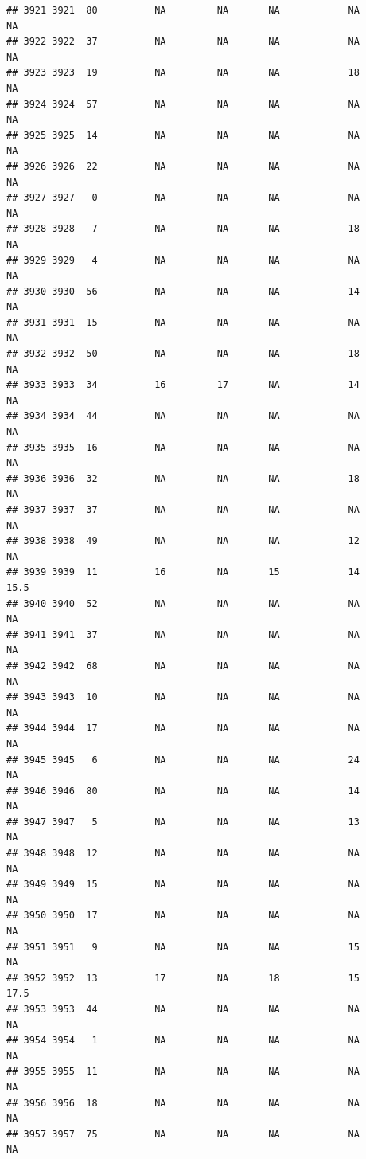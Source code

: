 \documentclass[man]{apa6}
\begin{document}
\begin{verbatim}
## 3921 3921  80          NA         NA       NA            NA       NA
## 3922 3922  37          NA         NA       NA            NA       NA
## 3923 3923  19          NA         NA       NA            18       NA
## 3924 3924  57          NA         NA       NA            NA       NA
## 3925 3925  14          NA         NA       NA            NA       NA
## 3926 3926  22          NA         NA       NA            NA       NA
## 3927 3927   0          NA         NA       NA            NA       NA
## 3928 3928   7          NA         NA       NA            18       NA
## 3929 3929   4          NA         NA       NA            NA       NA
## 3930 3930  56          NA         NA       NA            14       NA
## 3931 3931  15          NA         NA       NA            NA       NA
## 3932 3932  50          NA         NA       NA            18       NA
## 3933 3933  34          16         17       NA            14       NA
## 3934 3934  44          NA         NA       NA            NA       NA
## 3935 3935  16          NA         NA       NA            NA       NA
## 3936 3936  32          NA         NA       NA            18       NA
## 3937 3937  37          NA         NA       NA            NA       NA
## 3938 3938  49          NA         NA       NA            12       NA
## 3939 3939  11          16         NA       15            14     15.5
## 3940 3940  52          NA         NA       NA            NA       NA
## 3941 3941  37          NA         NA       NA            NA       NA
## 3942 3942  68          NA         NA       NA            NA       NA
## 3943 3943  10          NA         NA       NA            NA       NA
## 3944 3944  17          NA         NA       NA            NA       NA
## 3945 3945   6          NA         NA       NA            24       NA
## 3946 3946  80          NA         NA       NA            14       NA
## 3947 3947   5          NA         NA       NA            13       NA
## 3948 3948  12          NA         NA       NA            NA       NA
## 3949 3949  15          NA         NA       NA            NA       NA
## 3950 3950  17          NA         NA       NA            NA       NA
## 3951 3951   9          NA         NA       NA            15       NA
## 3952 3952  13          17         NA       18            15     17.5
## 3953 3953  44          NA         NA       NA            NA       NA
## 3954 3954   1          NA         NA       NA            NA       NA
## 3955 3955  11          NA         NA       NA            NA       NA
## 3956 3956  18          NA         NA       NA            NA       NA
## 3957 3957  75          NA         NA       NA            NA       NA

\end{verbatim}
\end{document}
